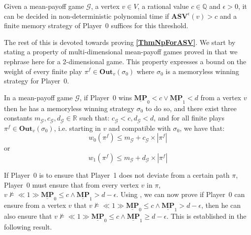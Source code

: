 \begin{theorem}
    \label{ThmNpForASV}
    Given a mean-payoff game $\mathcal{G}$, a vertex $v \in V$, a rational value $c \in \mathbb{Q}$ and $\epsilon > 0$, it can be decided in non-deterministic polynomial time if $\mathbf{ASV}^{\epsilon}(v) > c$ and a finite memory strategy of Player~0 suffices for this threshold.
\end{theorem}

\noindent The rest of this \mychapter is devoted towards proving \textbf{\cref{ThmNpForASV}}. We start by stating a property of multi-dimensional mean-payoff games proved in \cite{VCDHRR15} that we rephrase here for a 2-dimensional game. This property expresses a bound on the weight of every finite play $\pi^f \in \mathbf{Out}_v(\sigma_0)$ where $\sigma_0$ is a memoryless winning strategy for Player~0.

\begin{lemma}
    \label{LemWeightPlayGrtThanC}
    In a mean-payoff game $\mathcal{G}$, if Player~0 wins $\underline{\mathbf{MP}}_0 < c \lor \underline{\mathbf{MP}}_1 < d$ from a vertex $v$ then he has a memoryless winning strategy $\sigma_0$ to do so, and there exist three constants $m_\mathcal{G}, c_\mathcal{G}, d_\mathcal{G} \in \mathbb{R}$ such that: $c_\mathcal{G} < c, d_\mathcal{G} < d$, and for all finite plays $\pi^f \in \mathbf{Out}_v(\sigma_0)$, i.e. starting in $v$ and compatible with $\sigma_0$, we have that:
    \begin{equation*}
        w_0(\pi^f) \leqslant m_\mathcal{G} + c_\mathcal{G} \times |\pi^f|
    \end{equation*}
    or
    \begin{equation*}
        w_1(\pi^f) \leqslant m_\mathcal{G} + d_\mathcal{G} \times |\pi^f|
    \end{equation*}
\end{lemma}

\noindent If Player~0 is to ensure that Player~1 does not deviate from a certain path $\pi$, Player~0 must ensure that from every vertex $v$ in $\pi$, $v \nvDash \ll 1 \gg \underline{\mathbf{MP}}_0 \leqslant c \land \underline{\mathbf{MP}}_1 > d-\epsilon$. Using \textbf{}, we can now prove if Player~0 can ensure from a vertex $v$ that $v \nvDash \ll 1 \gg \underline{\mathbf{MP}}_0 \leqslant c \land \underline{\mathbf{MP}}_1 > d-\epsilon$, then he can also ensure that $v \nvDash \ll 1 \gg \underline{\mathbf{MP}}_0 \leqslant c \land \underline{\mathbf{MP}}_1 \geqslant d-\epsilon$. This is established in the following result.

